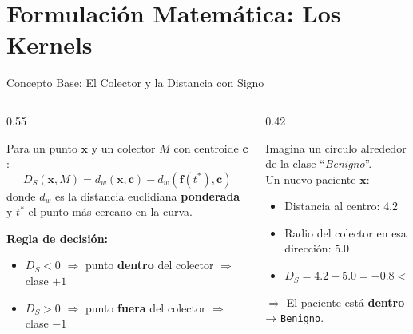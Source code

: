 \documentclass[aspectratio=169,10pt]{beamer}
\begin{document}
\section{Formulación Matemática: Los Kernels}

\begin{frame}{Concepto Base: El Colector y la Distancia con Signo}
  \begin{columns}[T]
    \begin{column}{0.55\textwidth}
      \begin{tcolorbox}[mydef={Distancia Radial con Signo $D_S$}]
        Para un punto $\mathbf{x}$ y un colector $M$ con centroide $\mathbf{c}$:
        \[
          D_S(\mathbf{x}, M) = d_w(\mathbf{x},\mathbf{c}) - d_w(\mathbf{f}(t^*),\mathbf{c})
        \]
        donde $d_w$ es la distancia euclidiana \textbf{ponderada} y $t^*$ el punto más cercano en la curva.
      \end{tcolorbox}
      \vspace{6pt}
      \textbf{Regla de decisión:}\\
      \begin{itemize}
        \item $D_S < 0$ $\Rightarrow$ \textcolor{accent3}{punto \textbf{dentro}} del colector $\Rightarrow$ clase $+1$
        \item $D_S > 0$ $\Rightarrow$ \textcolor{accent2}{punto \textbf{fuera}} del colector $\Rightarrow$ clase $-1$
      \end{itemize}
    \end{column}
    \begin{column}{0.42\textwidth}
      \begin{tcolorbox}[myex={Ejemplo intuitivo: 2D}]
        {\footnotesize
        Imagina un círculo alrededor de la clase ``\textit{Benigno}''.\\[4pt]
        Un nuevo paciente $\mathbf{x}$:
        \begin{itemize}
          \item Distancia al centro: $4.2$
          \item Radio del colector en esa dirección: $5.0$
          \item $D_S = 4.2 - 5.0 = -0.8 < 0$
        \end{itemize}
        $\Rightarrow$ El paciente está \textbf{dentro} → \texttt{Benigno}.}
      \end{tcolorbox}
    \end{column}
  \end{columns}
\end{frame}
\end{document}
